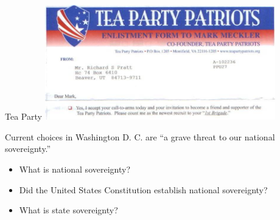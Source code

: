 \begin{frame}{Tea Party}
    \centering
    \includegraphics[width=0.75\textwidth]{img/tea-party.jpg} \\
    \begin{block}{}Current choices in Washington D. C. are ``a grave threat to our national sovereignty.'' \end{block}
    \begin{itemize}
        \item What is national sovereignty?
        \item Did the United States Constitution establish national sovereignty?
        \item What is state sovereignty?
    \end{itemize}
\end{frame}

